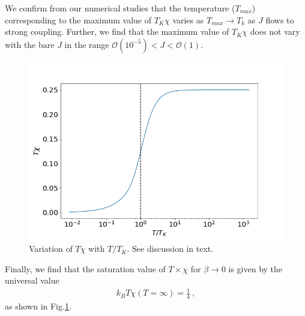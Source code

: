 \documentclass[aps,prb,preprint,groupedaddress]{revtex4-2}
\begin{document}
We confirm from our numerical studies that the temperature ($T_{max}$) corresponding to the maximum value of $T_{K}\chi$ varies as $T_{max}\to T_{k}$ as $J$ flows to strong coupling. Further, we find that the maximum value of $T_{K}\chi$ does not vary with the bare $J$ in the range $\mathcal{O}(10^{-5})<J<\mathcal{O}(1)$.
\begin{figure}[ht!]
\includegraphics[scale=0.5]{SusceptibilityVsTemp2.png}
\caption{Variation of $T\chi$ with $T/T_{K}$. See discussion in text.}\label{suscfig2}
\end{figure}
\par\noindent
Finally, we find that the saturation value of $T\times\chi$ for $\beta\to 0$ is given by the universal value
\begin{eqnarray}
k_{B}T\chi(T=\infty)=\frac{1}{4}~,
\end{eqnarray}
as shown in Fig.\ref{suscfig2}.
\end{document}
